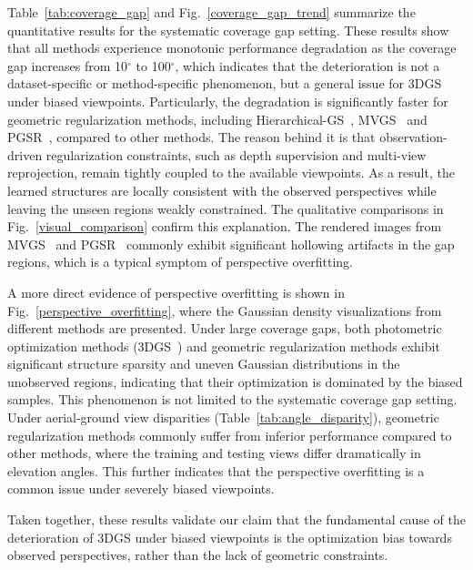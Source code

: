 \documentclass[lettersize,journal]{IEEEtran}
\begin{document}
Table~\ref{tab:coverage_gap} and Fig.~\ref{coverage_gap_trend} summarize the quantitative results for the systematic coverage gap setting. 
These results show that all methods experience monotonic performance degradation as the coverage gap increases from 10$^\circ$ to 100$^\circ$, 
which indicates that the deterioration is not a dataset-specific or method-specific phenomenon, but a general issue for 3DGS under biased viewpoints.
Particularly, the degradation is significantly faster for geometric regularization methods, including Hierarchical-GS~\cite{hierarchical}, MVGS~\cite{mvgs} and PGSR~\cite{pgsr}, compared to other methods.
The reason behind it is that observation-driven regularization constraints, such as depth supervision and multi-view reprojection, remain tightly coupled to the available viewpoints. As a result, the learned structures are locally consistent with the observed perspectives while leaving the unseen regions weakly constrained. 
The qualitative comparisons in Fig.~\ref{visual_comparison} confirm this explanation. The rendered images from MVGS~\cite{mvgs} and PGSR~\cite{pgsr} commonly exhibit significant hollowing artifacts in the gap regions, which is a typical symptom of perspective overfitting.

A more direct evidence of perspective overfitting is shown in Fig.~\ref{perspective_overfitting}, where the Gaussian density visualizations from different methods are presented. 
Under large coverage gaps, both photometric optimization methods (3DGS~\cite{3dgs}) and geometric regularization methods exhibit significant structure sparsity and uneven Gaussian distributions in the unobserved regions, 
indicating that their optimization is dominated by the biased samples. 
This phenomenon is not limited to the systematic coverage gap setting. Under aerial-ground view disparities (Table~\ref{tab:angle_disparity}), geometric regularization methods commonly suffer from inferior performance compared to other methods, where the training and testing views differ dramatically in elevation angles. This further indicates that the perspective overfitting is a common issue under severely biased viewpoints.

Taken together, these results validate our claim that the fundamental cause of the deterioration of 3DGS under biased viewpoints is the optimization bias towards observed perspectives, rather than the lack of geometric constraints.
\end{document}
